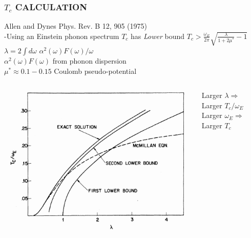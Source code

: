 \documentclass[amssymb,amsmath]{beamer}
\begin{document}
\begin{frame}
\frametitle{$T_c$ CALCULATION}
Allen and Dynes Phys. Rev. B 12, 905 (1975) \\
-Using an Einstein phonon spectrum $T_c$ has \emph{Lower} bound
$T_c> \frac{\omega_E}{2\pi}\sqrt{\frac{\lambda}{1+2\mu^*}-1}$ \\
$\lambda = 2\int d\omega\,\, \alpha^2(\omega) F(\omega)/\omega$ \\ \quad $\alpha^2(\omega) F(\omega)$ from phonon dispersion \\
$\mu^*\approx 0.1-0.15$ Coulomb pseudo-potential \\
\begin{columns}\begin{column}{0.5\textwidth}
\includegraphics[scale=0.39]{./figures/Tc_theory_dynes.png}
\end{column}
\begin{column}{0.36\textwidth}
\begin{block}{}
Larger $\lambda\Rightarrow$ Larger $T_c/\omega_E$ \\
Larger $\omega_E\Rightarrow$ Larger $T_c$
\end{block}
\end{column}\end{columns}
\end{frame}
\end{document}
